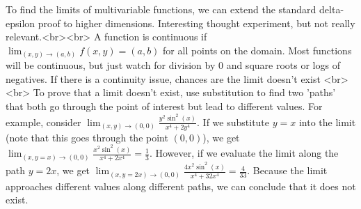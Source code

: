 To find the limits of multivariable functions, we can extend the standard delta-epsilon proof to higher dimensions. Interesting thought experiment, but not really relevant.<br><br>
A function is continuous if $\lim_{(x, y) \to (a, b)}f(x, y) = (a, b)$ for all points on the domain. Most functions will be continuous, but just watch for division by 0 and square roots or logs of negatives. If there is a continuity issue, chances are the limit doesn't exist <br><br>
To prove that a limit doesn't exist, use substitution to find two 'paths' that both go through the point of interest but lead to different values. For example, consider $\lim_{(x, y) \to (0, 0)}\frac{y^2\sin^2(x)}{x^4+2y^4}$. If we substitute $y=x$ into the limit (note that this goes through the point $(0, 0)$), we get $\lim_{(x, y=x) \to (0, 0)}\frac{x^2\sin^2(x)}{x^4+2x^4} = \frac{1}{3}$. However, if we evaluate the limit along the path $y=2x$, we get $\lim_{(x, y=2x) \to (0, 0)}\frac{4x^2\sin^2(x)}{x^4+32x^4} = \frac{4}{33}$. Because the limit approaches different values along different paths, we can conclude that it does not exist.
